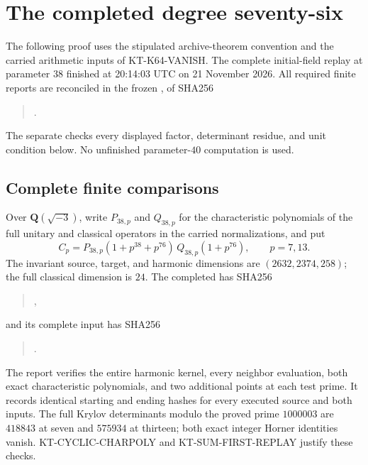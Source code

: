 \section{The completed degree seventy-six}
\label{sec:kt-further-e38}

The following proof uses the stipulated archive-theorem convention
and the carried arithmetic inputs of KT-K64-VANISH.  The complete
initial-field replay at parameter $38$ finished at 20:14:03 UTC on
21 November 2026.  All required finite reports are reconciled in
the frozen ,
of SHA256
\begin{quote}\small
{}.
\end{quote}
The separate  checks every
displayed factor, determinant residue, and unit condition below.
No unfinished parameter-$40$ computation is used.

\subsection{Complete finite comparisons}

Over $\mathbf Q(\sqrt{-3})$, write $P_{38,p}$ and $Q_{38,p}$ for
the characteristic polynomials of the full unitary and classical
operators in the carried normalizations, and put
\[
 C_p=P_{38,p}(1+p^{38}+p^{76})\,Q_{38,p}(1+p^{76}),
                  \qquad p=7,13.                         \tag{KF38.1}
\]
The invariant source, target, and harmonic dimensions are
$(2632,2374,258)$; the full classical dimension is $24$.
The completed 
has SHA256
\begin{quote}\small
{},
\end{quote}
and its complete input has SHA256
\begin{quote}\small
{}.
\end{quote}
The report verifies the entire harmonic kernel, every neighbor
evaluation, both exact characteristic polynomials, and two
additional points at each test prime.  It records identical
starting and ending hashes for every executed source and both
inputs.  The full Krylov determinants modulo the proved prime
$1000003$ are $418843$ at seven and $575934$ at thirteen;
both exact integer Horner identities vanish.
KT-CYCLIC-CHARPOLY and KT-SUM-FIRST-REPLAY justify these checks.

